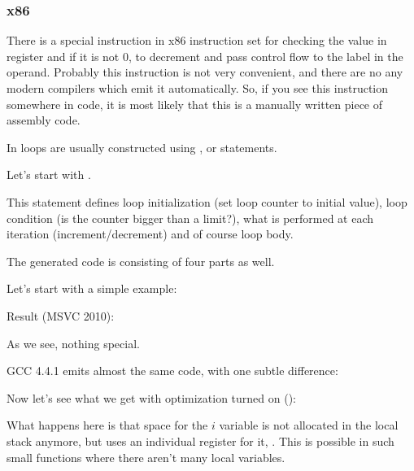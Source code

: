 \subsubsection{x86}


There is a special \LOOP instruction in x86 instruction set for checking the value in register \ECX and 
if it is not 0, to \gls{decrement} \ECX
and pass control flow to the label in the \LOOP operand. 
Probably this instruction is not very convenient, and there are no any modern compilers which emit it automatically.
So, if you see this instruction somewhere in code, it is most likely that this is a manually written piece 
of assembly code.

\par

In \CCpp loops are usually constructed using ,  or  statements.

Let's start with .

This statement defines loop initialization (set loop counter to initial value), 
loop condition (is the counter bigger than a limit?), what is performed at each iteration (\gls{increment}/\gls{decrement})
and of course loop body.



The generated code is consisting of four parts as well.

Let's start with a simple example:



Result (MSVC 2010):



As we see, nothing special.

GCC 4.4.1 emits almost the same code, with one subtle difference:



Now let's see what we get with optimization turned on (\TT{\Ox}):



What happens here is that space for the $i$ variable is not allocated in the local stack anymore,
but uses an individual register for it, \ESI.
This is possible in such small functions where there aren't many local variables.

